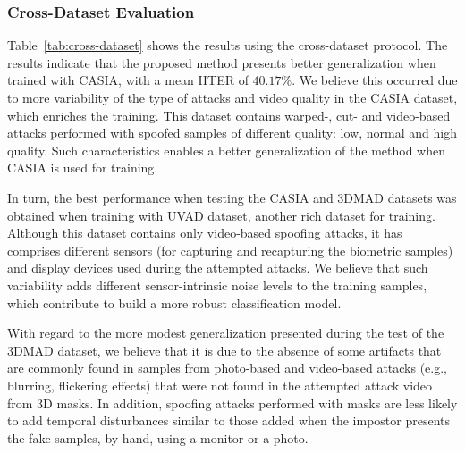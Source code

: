 \subsubsection{Cross-Dataset Evaluation}\label{subsec:OtherDatabase}

Table~\ref{tab:cross-dataset} shows the results using the cross-dataset protocol. The results indicate that the proposed method presents better generalization when trained with CASIA, with a mean HTER of $40.17\%$. We believe this occurred due to more variability of the type of attacks and video quality in the CASIA dataset, which enriches the training. This dataset contains warped-, cut- and video-based attacks performed with spoofed samples of different quality: low, normal and high quality. Such characteristics enables a better generalization of the method when CASIA is used for training.

{In turn, the best performance when testing the CASIA and 3DMAD datasets was obtained when training with UVAD dataset, another rich dataset for training. Although this dataset contains only video-based spoofing attacks, it has comprises different sensors (for capturing and recapturing the biometric samples) and display devices used during the attempted attacks. We believe that such variability adds different sensor-intrinsic noise levels to the training samples, which contribute to build a more robust classification model.}

{With regard to the more modest generalization presented during the test of the 3DMAD dataset, we believe that it is due to the absence of some artifacts that are commonly found in samples from photo-based and video-based attacks (e.g., blurring, flickering effects) that were not found in the attempted attack video from 3D masks. In addition, spoofing attacks performed with masks are less likely to add temporal disturbances similar to those added when the impostor presents the fake samples, by hand, using a monitor or a photo.}

